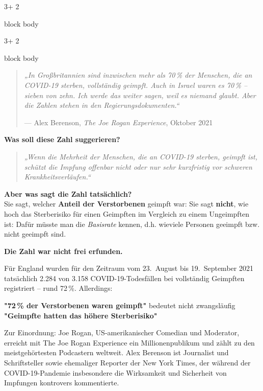 \documentclass{beamer}
\begin{document}
\begin{frame}[t]
\begin{textblock*}{3\colwidth + 2\colsep}
\begin{alertblock}
\begin{minipage}{\textwidth}
\begin{beamercolorbox}[
			ht = 23.5cm, 
			wd = \linewidth, 
			left
		]{block body}
\begin{textblock*}{3\colwidth + 2\colsep}
\begin{alertblock}
\begin{minipage}{\textwidth}
\begin{beamercolorbox}[
			ht = 23.5cm, 
			wd = \linewidth, 
			left
		]{block body}
			\begin{quote}
			\textit{„In Großbritannien sind inzwischen mehr als 70\,\% der Menschen, die an COVID-19 sterben, vollständig geimpft. Auch in Israel waren es 70\,\% – sieben von zehn. Ich werde das weiter sagen, weil es niemand glaubt. Aber die Zahlen stehen in den Regierungsdokumenten.“}
			
			\hfill --- Alex Berenson, \textit{The Joe Rogan Experience}, Oktober 2021
			\end{quote}

			\vspace{0.5cm}

			\textbf{Was soll diese Zahl suggerieren?}
			\begin{quote}
			\textit{„Wenn die Mehrheit der Menschen, die an COVID-19 sterben, geimpft ist, schützt die Impfung offenbar nicht oder nur sehr kurzfristig vor schweren Krankheitsverläufen.“}
			\end{quote}

			\vspace{0.3cm}

			\textbf{Aber was sagt die Zahl tatsächlich?} \\
			Sie sagt, welcher \textbf{Anteil der Verstorbenen} geimpft war:	Sie sagt \textbf{nicht}, wie hoch das Sterberisiko für einen Geimpften im Vergleich zu einem Ungeimpften ist: Dafür müsste man die \textit{Basisrate} kennen, d.h. wieviele Personen geeimpft bzw. nicht geeimpft sind.
			\vspace{0.3cm}

			\textbf{Die Zahl war nicht frei erfunden.}

Für England wurden für den Zeitraum vom 23.\ August bis 19.\ September 2021 tatsächlich 2.284 von 3.158 COVID-19-Todesfällen bei vollständig Geimpften registriert – rund 72\,\%. Allerdings: 
			\vspace{0.3cm}

			\begin{center}
\textbf{"72\,\% der Verstorbenen waren geimpft"} bedeutet nicht zwangsläufig
\textbf{"Geimpfte hatten das höhere Sterberisiko"}
\end{center}
	
	\vspace{0.5cm}
	Zur Einordnung:
	Joe Rogan, US-amerikanischer Comedian und Moderator, erreicht mit The Joe Rogan Experience ein Millionenpublikum und zählt zu den meistgehörtesten Podcastern weltweit.
	Alex Berenson ist Journalist und Schriftsteller sowie ehemaliger Reporter der New York Times, der während der COVID-19-Pandemie insbesondere die Wirksamkeit und Sicherheit von Impfungen kontrovers kommentierte.


\end{beamercolorbox}
\end{minipage}
\end{alertblock}
\end{textblock*}
\end{beamercolorbox}
\end{minipage}
\end{alertblock}
\end{textblock*}
\end{frame}
\end{document}
